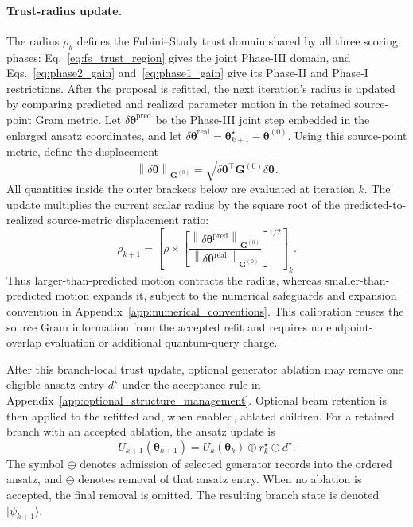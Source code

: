 \documentclass[
  reprint,
  amsmath,
  amssymb,
  aps,
  pra,
  nofootinbib,
  superscriptaddress,
  floatfix
]{revtex4-2}
\newcommand{\ket}[1]{|#1\rangle}
\begin{document}
\paragraph*{Trust-radius update.}
The radius \(\rho_k\) defines the Fubini--Study trust domain shared by all
three scoring phases: Eq.~\eqref{eq:fs_trust_region} gives the joint Phase-III
domain, and Eqs.~\eqref{eq:phase2_gain} and~\eqref{eq:phase1_gain} give its
Phase-II and Phase-I restrictions. After the proposal is refitted, the next
iteration's radius is updated by comparing predicted and realized parameter
motion in the retained source-point Gram metric. Let
\(\delta\boldsymbol\theta^{\mathrm{pred}}\) be the Phase-III joint step
embedded in the enlarged ansatz coordinates, and let
\(\delta\boldsymbol\theta^{\mathrm{real}}
=\boldsymbol\theta_{k+1}^{\star}
-\boldsymbol\theta^{(0)}\). Using this source-point metric, define the
displacement
\begin{equation}
\left\|\delta\boldsymbol\theta\right\|_{\mathbf G^{(0)}}
=
\sqrt{
\delta\boldsymbol\theta^\top
\mathbf G^{(0)}
\delta\boldsymbol\theta
}.
\label{eq:source_metric_displacements}
\end{equation}
All quantities inside the outer brackets below are evaluated at iteration \(k\).
The update multiplies the current scalar radius by the square root of the
predicted-to-realized source-metric displacement ratio:
\begin{equation}
\rho_{k+1}
=
\left[
\rho
\times
\left[
\frac{
\left\|\delta\boldsymbol\theta^{\mathrm{pred}}\right\|_{\mathbf G^{(0)}}
}{
\left\|\delta\boldsymbol\theta^{\mathrm{real}}\right\|_{\mathbf G^{(0)}}
}
\right]^{1/2}
\right]_k .
\label{eq:adaptive_trust_radius}
\end{equation}
Thus larger-than-predicted motion contracts the radius, whereas
smaller-than-predicted motion expands it, subject to the numerical safeguards
and expansion convention in Appendix~\ref{app:numerical_conventions}. This
calibration reuses the source Gram information from the accepted refit and
requires no endpoint-overlap evaluation or additional quantum-query charge.

After this branch-local trust update, optional generator ablation may remove
one eligible ansatz entry \(d^\star\) under the acceptance rule in
Appendix~\ref{app:optional_structure_management}. Optional beam retention is
then applied to the refitted and, when enabled, ablated children. For a
retained branch with an accepted ablation, the ansatz update is
%
\begin{equation*}
U_{k+1}(\boldsymbol\theta_{k+1})
=
U_k(\boldsymbol\theta_k)
\oplus
r_k^\star
\ominus
d^\star .
\end{equation*}
%
The symbol \(\oplus\) denotes admission of selected generator records into the
ordered ansatz, and \(\ominus\) denotes removal of that ansatz entry. When no
ablation is accepted, the final removal is omitted. The resulting branch state
is denoted \(\ket{\psi_{k+1}}\).
\end{document}
